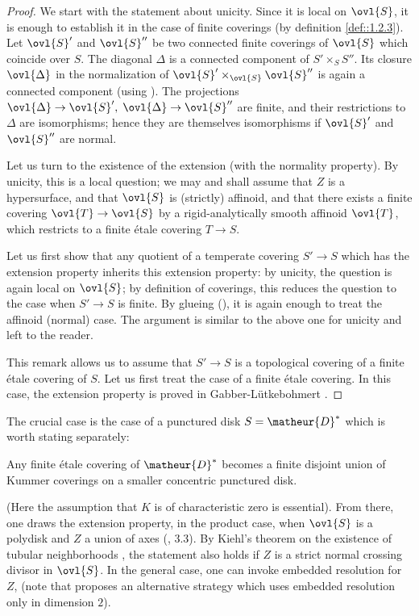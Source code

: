 \begin{proof}
 We start with the statement about unicity. Since it is local on
 $\ovl{S}$, it is enough to establish it in the case of finite coverings
 (by definition \ref{def::1.2.3}). Let $\ovl{S}'$ and $\ovl{S}''$ be two
 connected 
 finite coverings of $\ovl{S}$ which coincide over $S$. The diagonal
 $\Delta$ is a connected component of $S'\times_S S''$. Its closure
 $\ovl{\Delta} $ in the normalization of $\ovl{S}'\times_{\ovl{S}}
 \ovl{S}''$ is again a connected component (using \cite[3.3.16]{spasalc}).
 The projections $\ovl{\Delta} \to \ovl{S}',\;\ovl{\Delta} \to
 \ovl{S}''$ are finite, and their restrictions to $\Delta$ are
 isomorphisms; hence they are themselves isomorphisms if $\ovl{S}'$ and
 $\ovl{S}''$ are normal.

 Let us turn to the existence of the extension (with the normality
 property). By unicity, this is a local question; we may and shall
 assume that $Z$ is a hypersurface, and that 
 $\ovl{S}$ is (strictly) affinoid, and that there exists a finite
 covering $\ovl{T}\to \ovl{S}$ by a 
 rigid-analytically smooth affinoid $\ovl{T}$, which restricts to a finite
 \'etale covering $T\to S$. 

 Let us first show that any quotient of a temperate covering $S'\to S$
 which has the extension property inherits this extension property: by
 unicity, the question is again local on $\ovl{S}$; by definition of
 coverings, this reduces the question to the case when $S'\to S$ is
 finite. By glueing (\cf \cite[1.3.3]{ecfnas}), it is again enough to treat
 the affinoid (normal) case. The argument is similar to the above one
 for unicity and left to the reader.
 
 This remark allows us to assume that $S'\to S$ is a topological covering of a
 finite \'etale covering of $S$. 
 Let us first treat the case of a finite \'etale covering. In this
 case, the extension property is proved in Gabber-L\"utkebohmert 
 \cite{repfapf}.
\end{proof}

The crucial case is the case of a punctured disk $S=\matheur{D}^{\ast}$
which is worth stating separately:

\begin{lem}\label{lem::2.1.11} Any finite
 \'etale covering of $\matheur{D}^\ast$ becomes a finite disjoint union
 of Kummer coverings on a smaller concentric punctured disk.
\end{lem}
\noindent (Here the assumption that $K$ is of characteristic zero is
essential). From there, one draws the extension property, in the product
case, when $\ovl{S}$ is a polydisk and $Z$ a union of axes (, 3.3). By Kiehl's theorem on the existence of tubular
neighborhoods \cite{kiehl67:_rham_kohom_mannig_koerp}, the statement
also holds if $Z$ is a strict 
normal crossing divisor in $\ovl{S}$. In the general case, one can
invoke embedded resolution for $Z$, \cf \cite{schoutens99:_embed} (note that 
\cite[\S 4]{repfapf} proposes an alternative strategy which uses embedded
resolution only in dimension $2$).
 
